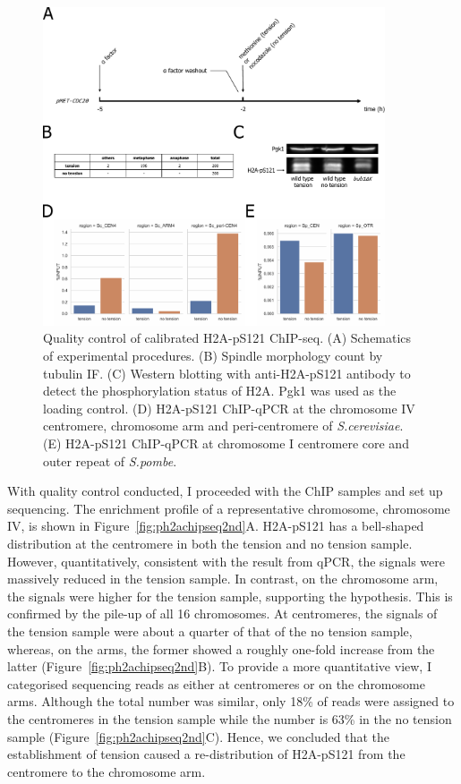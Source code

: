 \begin{figure}[htbp]
  \centering
  \includegraphics[width=0.9\textwidth]{chapter3/figures/checking.pdf}
  \caption[Quality control of calibrated H2A-pS121 ChIP-seq]{Quality control of calibrated H2A-pS121 ChIP-seq. (A) Schematics of experimental procedures. (B) Spindle morphology count by tubulin IF. (C) Western blotting with anti-H2A-pS121 antibody to detect the phosphorylation status of H2A. Pgk1 was used as the loading control. (D) H2A-pS121 ChIP-qPCR at the chromosome IV centromere, chromosome arm and peri-centromere of \textit{S.cerevisiae}. (E) H2A-pS121 ChIP-qPCR at chromosome I centromere core and outer repeat of \textit{S.pombe}. }
  \label{fig:ph2achipseqchecking}
\end{figure}

With quality control conducted, I proceeded with the ChIP samples and set up sequencing. The enrichment profile of a representative chromosome, chromosome IV, is shown in Figure~\ref{fig:ph2achipseq2nd}A. H2A-pS121 has a bell-shaped distribution at the centromere in both the tension and no tension sample. However, quantitatively, consistent with the result from qPCR, the signals were massively reduced in the tension sample. In contrast, on the chromosome arm, the signals were higher for the tension sample, supporting the hypothesis. This is confirmed by the pile-up of all 16 chromosomes. At centromeres, the signals of the tension sample were about a quarter of that of the no tension sample, whereas, on the arms, the former showed a roughly one-fold increase from the latter (Figure~\ref{fig:ph2achipseq2nd}B). To provide a more quantitative view, I categorised sequencing reads as either at centromeres or on the chromosome arms. Although the total number was similar, only 18\% of reads were assigned to the centromeres in the tension sample while the number is 63\% in the no tension sample (Figure~\ref{fig:ph2achipseq2nd}C). Hence, we concluded that the establishment of tension caused a re-distribution of H2A-pS121 from the centromere to the chromosome arm. 

